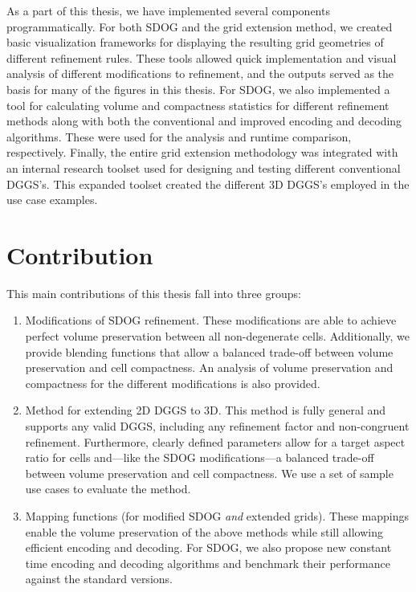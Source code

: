 As a part of this thesis, we have implemented several components programmatically.
For both SDOG and the grid extension method, we created basic visualization frameworks for displaying the resulting grid geometries of different refinement rules.
These tools allowed quick implementation and visual analysis of different modifications to refinement, and the outputs served as the basis for many of the figures in this thesis.
For SDOG, we also implemented a tool for calculating volume and compactness statistics for different refinement methods along with both the conventional and improved encoding and decoding algorithms.
These were used for the analysis and runtime comparison, respectively.
Finally, the entire grid extension methodology was integrated with an internal research toolset used for designing and testing different conventional DGGS's.
This expanded toolset created the different 3D DGGS's employed in the use case examples.


\section{Contribution} \label{chap:1:contribution}
This main contributions of this thesis fall into three groups:

\begin{enumerate}
	\item Modifications of SDOG refinement.
	These modifications are able to achieve perfect volume preservation between all non-degenerate cells.
	Additionally, we provide blending functions that allow a balanced trade-off between volume preservation and cell compactness.
	An analysis of volume preservation and compactness for the different modifications is also provided.
	
	\item Method for extending 2D DGGS to 3D.
	This method is fully general and supports any valid DGGS, including any refinement factor and non-congruent refinement.
	Furthermore, clearly defined parameters allow for a target aspect ratio for cells and---like the SDOG modifications---a balanced trade-off between volume preservation and cell compactness.
	We use a set of sample use cases to evaluate the method.
	
	\item Mapping functions (for modified SDOG \textit{and} extended grids).
	These mappings enable the volume preservation of the above methods while still allowing efficient encoding and decoding.
	For SDOG, we also propose new constant time encoding and decoding algorithms and benchmark their performance against the standard versions.
\end{enumerate}


